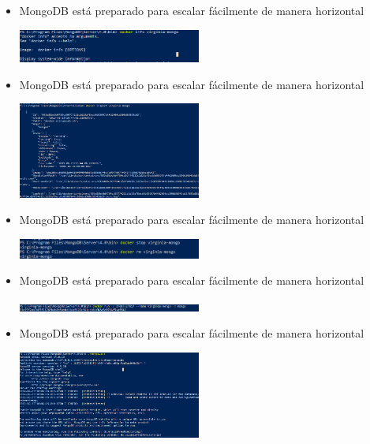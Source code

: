 \documentclass[%
 reprint,
 amsmath,amssymb,
 aps,
]{revtex4-1}
\begin{document}
\begin{itemize}
\begin{center}
		\end{center}	
                    \item MongoDB está preparado para escalar fácilmente de manera horizontal
                     \begin{center}
		\includegraphics[width=6cm]{./Imagenes/21}
		\end{center}
                     \item MongoDB está preparado para escalar fácilmente de manera horizontal
                     \begin{center}
		\includegraphics[width=6cm]{./Imagenes/22}
		\end{center}
                     \item MongoDB está preparado para escalar fácilmente de manera horizontal
                     \begin{center}
		\includegraphics[width=6cm]{./Imagenes/23}
		\end{center}	
                      \item MongoDB está preparado para escalar fácilmente de manera horizontal
                     \begin{center}
		\includegraphics[width=6cm]{./Imagenes/24}
		\end{center}	
                     \item MongoDB está preparado para escalar fácilmente de manera horizontal
                     \begin{center}
		\includegraphics[width=6cm]{./Imagenes/25}
		\end{center}		
	          \end{itemize}
\end{document}
